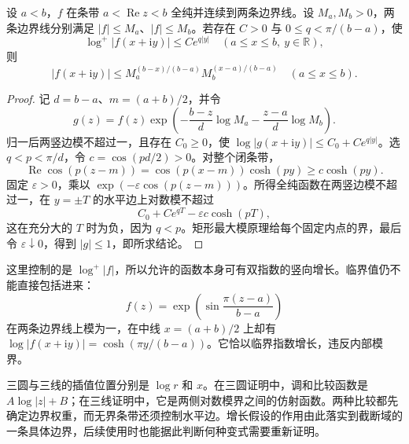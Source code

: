\begin{proposition}[允许竖向增长的三线不等式]\label{b3:prop:19-three-lines-growth}
设 \(a<b\)，\(f\) 在条带 \(a<\operatorname{Re}z<b\) 全纯并连续到两条边界线。设 \(M_a,M_b>0\)，两条边界线分别满足 \(|f|\le M_a\)、\(|f|\le M_b\)。若存在 \(C>0\) 与 \(0\le q<\pi/(b-a)\)，使
\[
 \log^+|f(x+\mathrm iy)|\le Ce^{q|y|}
 \quad(a\le x\le b,\ y\in\mathbb R),
\]
则
\[
 |f(x+\mathrm iy)|\le
 M_a^{(b-x)/(b-a)}M_b^{(x-a)/(b-a)}
 \quad(a\le x\le b).
\]
\end{proposition}
\begin{proof}
记 \(d=b-a\)、\(m=(a+b)/2\)，并令
\[
 g(z)=f(z)\exp\left(-\frac{b-z}{d}\log M_a
                         -\frac{z-a}{d}\log M_b\right).
\]
归一后两竖边模不超过一，且存在 \(C_0\ge0\)，使
\(\log|g(x+\mathrm iy)|\le C_0+Ce^{q|y|}\)。选 \(q<p<\pi/d\)，令 \(c=\cos(pd/2)>0\)。对整个闭条带，
\[
 \operatorname{Re}\cos(p(z-m))
 =\cos(p(x-m))\cosh(py)\ge c\cosh(py).
\]
固定 \(\varepsilon>0\)，乘以 \(\exp(-\varepsilon\cos(p(z-m)))\)。所得全纯函数在两竖边模不超过一，在 \(y=\pm T\) 的水平边上对数模不超过
\[
 C_0+Ce^{qT}-\varepsilon c\cosh(pT),
\]
这在充分大的 \(T\) 时为负，因为 \(q<p\)。矩形最大模原理给每个固定内点的界，最后令 \(\varepsilon\downarrow0\)，得到 \(|g|\le1\)，即所求结论。
\end{proof}

这里控制的是 \(\log^+|f|\)，所以允许的函数本身可有双指数的竖向增长。临界值仍不能直接包括进来：
\[
 f(z)=\exp\left(\sin\frac{\pi(z-a)}{b-a}\right)
\]
在两条边界线上模为一，在中线 \(x=(a+b)/2\) 上却有
\(\log|f(x+\mathrm iy)|=\cosh(\pi y/(b-a))\)。它恰以临界指数增长，违反内部模界。

\ProseParagraphBreak

三圆与三线的插值位置分别是 \(\log r\) 和 \(x\)。在三圆证明中，调和比较函数是 \(A\log|z|+B\)；在三线证明中，它是两侧对数模界之间的仿射函数。两种比较都先确定边界权重，而无界条带还须控制水平边。增长假设的作用由此落实到截断域的一条具体边界，后续使用时也能据此判断何种变式需要重新证明。
